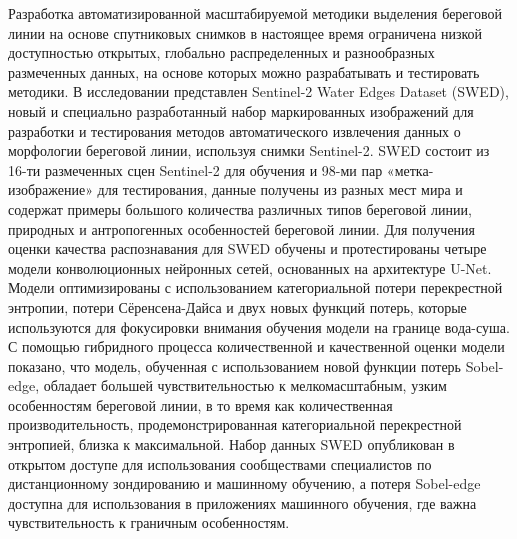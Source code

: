 \documentclass[732,14pt,final]{studrep}
\begin{document}
Разработка автоматизированной масштабируемой методики выделения береговой линии на основе спутниковых снимков в настоящее время ограничена низкой доступностью открытых, глобально распределенных и разнообразных размеченных данных, на основе которых можно разрабатывать и тестировать методики. В исследовании \cite{b2} представлен Sentinel-2 Water Edges Dataset (SWED), новый и специально разработанный набор маркированных изображений для разработки и тестирования методов автоматического извлечения данных о морфологии береговой линии, используя снимки Sentinel-2. SWED состоит из 16-ти размеченных сцен Sentinel-2 для обучения и 98-ми пар «метка-изображение» для тестирования, данные получены из разных мест мира и содержат примеры большого количества различных типов береговой линии, природных и антропогенных особенностей береговой линии. Для получения оценки качества распознавания для SWED обучены и протестированы четыре модели конволюционных нейронных сетей, основанных на архитектуре U-Net. Модели оптимизированы с использованием категориальной потери перекрестной энтропии, потери Сёренсена-Дайса и двух новых функций потерь, которые используются для фокусировки внимания обучения модели на границе вода-суша. С помощью гибридного процесса количественной и качественной оценки модели показано, что модель, обученная с использованием новой функции потерь Sobel-edge, обладает большей чувствительностью к мелкомасштабным, узким особенностям береговой линии, в то время как количественная производительность, продемонстрированная категориальной перекрестной энтропией, близка к максимальной. Набор данных SWED опубликован в открытом доступе для использования сообществами специалистов по дистанционному зондированию и машинному обучению, а потеря Sobel-edge доступна для использования в приложениях машинного обучения, где важна чувствительность к граничным особенностям.
\end{document}
